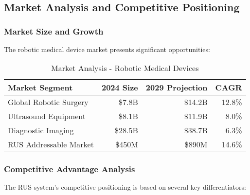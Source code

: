 \subsection{Market Analysis and Competitive Positioning}

\subsubsection{Market Size and Growth}
The robotic medical device market presents significant opportunities:

\begin{table}[htbp]
\centering
\caption{Market Analysis - Robotic Medical Devices}
\label{tab:market-analysis}
\begin{tabular}{|l|r|r|r|}
\hline
\textbf{Market Segment} & \textbf{2024 Size} & \textbf{2029 Projection} & \textbf{CAGR} \\
\hline
Global Robotic Surgery & \$7.8B & \$14.2B & 12.8\% \\
Ultrasound Equipment & \$8.1B & \$11.9B & 8.0\% \\
Diagnostic Imaging & \$28.5B & \$38.7B & 6.3\% \\
RUS Addressable Market & \$450M & \$890M & 14.6\% \\
\hline
\end{tabular}
\end{table}

\subsubsection{Competitive Advantage Analysis}
The RUS system's competitive positioning is based on several key differentiators:

